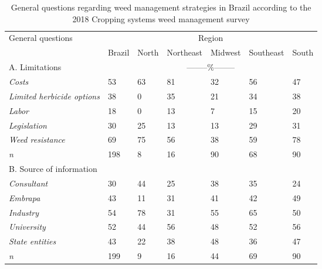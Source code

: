 \documentclass[
  12pt,
  a4paper]{article}
\begin{document}
\pagebreak
\newpage

\begin{table}[ht]
\centering
\caption{General questions regarding weed management strategies in Brazil according to the 2018 Cropping systems weed management survey}
\label{tab:my-table}
\begin{tabular}{@{}lllllll@{}}
\toprule
\multirow{2}{*}{General questions} & \multicolumn{6}{c}{Region}                               \\ \cmidrule(l){2-7} 
                                   & Brazil & North & Northeast & Midwest & Southeast & South \\ \midrule
A. Limitations                     & \multicolumn{6}{c}{--------\%--------}                             \\
\hspace{3mm}\textit{Costs}                     & 53     & 63    & 81        & 32      & 56        & 47    \\
\hspace{3mm}\textit{Limited herbicide options} & 38     & 0     & 35        & 21      & 34        & 38    \\
\hspace{3mm}\textit{Labor}                     & 18     & 0     & 13        & 7       & 15        & 20    \\
\hspace{3mm}\textit{Legislation}               & 30     & 25    & 13        & 13      & 29        & 31    \\
\hspace{3mm}\textit{Weed resistance}           & 69     & 75    & 56        & 38      & 59        & 78    \\
\hspace{3mm}\textit{n}                         & 198    & 8     & 16        & 90      & 68        & 90    \\
B. Source of information           &        &       &           &         &           &       \\
\hspace{3mm}\textit{Consultant}                & 30     & 44    & 25        & 38      & 35        & 24    \\
\hspace{3mm}\textit{Embrapa}                   & 43     & 11    & 31        & 41      & 42        & 49    \\
\hspace{3mm}\textit{Industry}                  & 54     & 78    & 31        & 55      & 65        & 50    \\
\hspace{3mm}\textit{University}                & 52     & 44    & 56        & 48      & 52        & 56    \\
\hspace{3mm}\textit{State entities}            & 43     & 22    & 38        & 48      & 36        & 47    \\
\hspace{3mm}\textit{n}                         & 199    & 9     & 16        & 44      & 69        & 90    \\ \bottomrule
\end{tabular}
\end{table}
\end{document}
